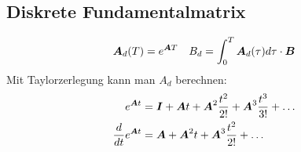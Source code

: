 \subsection{Diskrete Fundamentalmatrix}
    \begin{tcolorbox}[colback=white!10!white,colframe=green!30!black,title=Definition] 
        \begin{align*}
            \boldsymbol{A}_d(T)= e^{\boldsymbol{A}T} && B_d = \int_{0}^{T}\boldsymbol{A}_d
        (\tau)d\tau    \cdot \boldsymbol{B} 
\end{align*}
Mit Taylorzerlegung kann man $A_d$ berechnen:
\begin{align*}
    e^{\boldsymbol{A}t}  &= \boldsymbol{I} + \boldsymbol{A}t+\boldsymbol{A}^2\frac{t^2}{2!} + \boldsymbol{A}^3\frac{t^3}{3!}+ \ldots\\
    \frac{d}{dt}e^{\boldsymbol{A}t} &= \boldsymbol{A} + \boldsymbol{A}^2t+\boldsymbol{A}^3\frac{t^2}{2!} + \ldots
\end{align*}
    \end{tcolorbox}    

